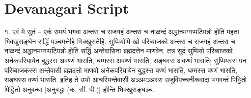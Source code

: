 \section{Devanagari Script}
१. एवं मे सुतं – एकं समयं भगवा अन्तरा च राजगहं अन्तरा च नाळन्दं अद्धानमग्गप्पटिपन्नो होति महता भिक्खुसङ्घेन सद्धिं पञ्चमत्तेहि भिक्खुसतेहि. सुप्पियोपि खो परिब्बाजको अन्तरा च राजगहं अन्तरा च नाळन्दं अद्धानमग्गप्पटिपन्नो होति सद्धिं अन्तेवासिना ब्रह्मदत्तेन माणवेन. तत्र सुदं सुप्पियो परिब्बाजको अनेकपरियायेन बुद्धस्स अवण्णं भासति, धम्मस्स अवण्णं भासति, सङ्घस्स अवण्णं भासति; सुप्पियस्स पन परिब्बाजकस्स अन्तेवासी ब्रह्मदत्तो माणवो अनेकपरियायेन बुद्धस्स वण्णं भासति, धम्मस्स वण्णं भासति, सङ्घस्स वण्णं भासति. इतिह ते उभो आचरियन्तेवासी अञ्ञमञ्ञस्स उजुविपच्चनीकवादा भगवन्तं पिट्ठितो पिट्ठितो अनुबन्धा [अनुबद्धा (क. सी. पी.)] होन्ति भिक्खुसङ्घञ्च.